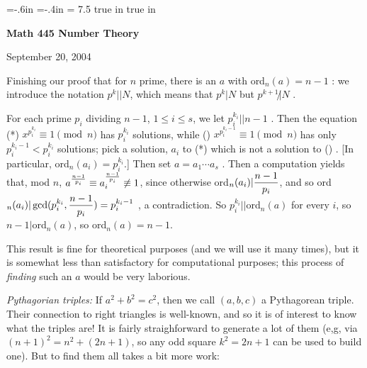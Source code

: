 





\loadmsbm

\nopagenumbers
\parindent=0pt

\voffset=-.6in
\hoffset=-.4in
\hsize = 7.5 true in
 true in


\overfullrule=0pt


\def\ctln{\centerline}
\def\u{\underbar}
\def\ssk{\smallskip}
\def\msk{\medskip}
\def\bsk{\bigskip}


\ctln{\bf Math 445 Number Theory}

\medskip

\ctln{September 20, 2004}

\bigskip

Finishing our proof that for $n$ prime, there is an $a$ with ord$_n(a)=n-1$ : we introduce the notation 
$p^k||N$, which means that $p^k|N$ but $p^{k+1}\not |N$ .

\ssk

For each prime $p_i$ dividing $n-1$, $1\leq i\leq s$, we let $p_i^{k_i}||n-1$ . 
Then the equation 
(*) $x^{p_i^{k_i}}\equiv 1\pmod{n}$ has $p_i^{k_i}$ solutions, while
(\dag) $x^{p_i^{k_i-1}}\equiv 1\pmod{n}$ has only $p_i^{k_i-1}<p_i^{k_i}$ solutions; 
pick a solution, $a_i$ to (*) which is not a solution to (\dag) . 
[In particular, ord$_n(a_i)=p_i^{k_i}$.] 
Then set $a=a_1\cdots a_s$ . 
Then a computation yields that, mod $n$, 
$\displaystyle a^{{n-1}\over{p_i}} \equiv a_i^{{n-1}\over{p_i}}\not\equiv 1$, since otherwise
ord$\displaystyle _n(a_i)|{{n-1}\over{p_i}}$, and so 
ord$\displaystyle _n(a_i)|\gcd(p_i^{k_i},{{n-1}\over{p_i}})=p_i^{k_i-1}$ , a contradiction.
So $p_i^{k_i}||$ord$_n(a)$ for every $i$, so 
$n-1|$ord$_n(a)$, so ord$_n(a)=n-1$.

\msk

This result is fine for theoretical purposes (and we will use it many times), but it is somewhat less than satisfactory for computational
purposes; this process of {\it finding} such an $a$ would be very laborious.

\bsk

{\it Pythagorian triples:} If $a^2+b^2=c^2$, then we call $(a,b,c)$ a Pythagorean triple. Their connection to right triangles is
well-known, and so it is of interest to know what the triples are! It is fairly straighforward to generate a lot of them (e,g, via
$(n+1)^2=n^2+(2n+1)$, so any odd square $k^2=2n+1$ can be used to build one). But to find them all takes a bit more work:

